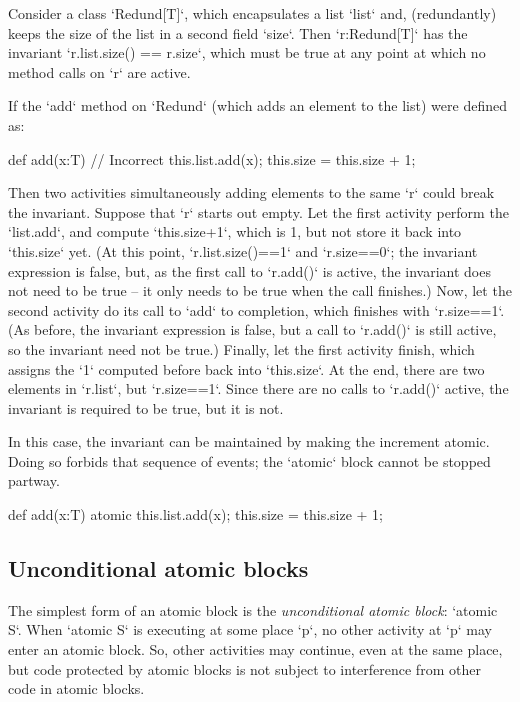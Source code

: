 \begin{ex}
Consider a class \xcd`Redund[T]`, which encapsulates a list
\xcd`list` and, (redundantly) keeps the size of the list in a second field
\xcd`size`.  Then \xcd`r:Redund[T]` has the invariant 
\xcd`r.list.size() == r.size`, which must be true at any point at which
no method calls on \xcd`r` are active.

If the \xcd`add` method on \xcd`Redund` (which adds an element to the list) 
were defined as: 
\begin{xten}
def add(x:T) { // Incorrect
  this.list.add(x);
  this.size = this.size + 1;
}
\end{xten}
Then two activities simultaneously adding elements to the same \xcd`r` could break the
invariant.  Suppose that \xcd`r` starts out empty.  Let the first activity
perform the \xcd`list.add`, and compute \xcd`this.size+1`, which is 1, but not store it
back into \xcd`this.size` yet.  
(At this point, \xcd`r.list.size()==1` and \xcd`r.size==0`; the invariant
expression is false, but, as the first call to \xcd`r.add()` is active, the
invariant does not need to be true -- it only needs to be true when the
call finishes.)
Now, let the second activity do its call to
\xcd`add` to completion, which finishes with \xcd`r.size==1`.  
(As before, the invariant expression is false, but a call to \xcd`r.add()` is
still active, so the invariant need not be true.)
Finally, let
the first activity finish, which assigns the \xcd`1` computed before back into
\xcd`this.size`.  At the end, there are two elements in \xcd`r.list`, but
\xcd`r.size==1`. Since there are no calls to \xcd`r.add()` active, the
invariant is required to be true, but it is not.

In this case, the invariant can be maintained by making the increment atomic.
Doing so forbids that sequence of events; the \xcd`atomic` block cannot be
stopped partway.  
\begin{xten}
def add(x:T) { 
  atomic {
    this.list.add(x);
    this.size = this.size + 1; 
  }
}
\end{xten}
\end{ex}

\subsection{Unconditional atomic blocks}
The simplest form of an atomic block is the {\em unconditional
atomic block}: \xcd`atomic S`.
When \xcd`atomic S` is executing at some place \xcd`p`, no other activity at
\xcd`p` may enter an atomic block.  
So, other activities may continue, even at the same place, but code protected
by atomic blocks is not subject to interference from other code in atomic
blocks. 


